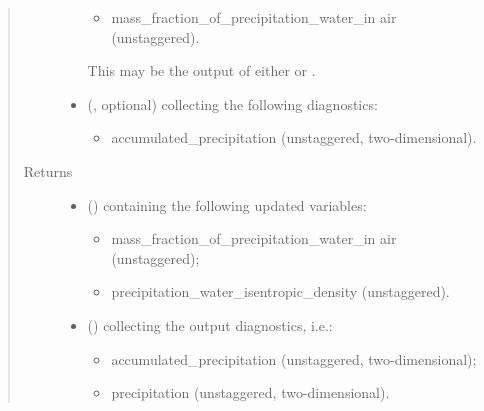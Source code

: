 \documentclass[letterpaper,10pt,english]{sphinxmanual}
\begin{document}
\begin{fulllineitems}
\begin{fulllineitems}
\begin{quote}
\begin{description}
\begin{itemize}
\begin{itemize}
\item {} 
mass\_fraction\_of\_precipitation\_water\_in air (unstaggered).

\end{itemize}

This may be the output of either
 or
.


\item {} 
 (, optional) \textendash{} 
 collecting the following diagnostics:
\begin{itemize}
\item {} 
accumulated\_precipitation (unstaggered, two-dimensional).

\end{itemize}


\end{itemize}

\item[{Returns}] \leavevmode
\begin{itemize}
\item {} 
 () \textendash{}  containing the following updated variables:
\begin{itemize}
\item {} 
mass\_fraction\_of\_precipitation\_water\_in air (unstaggered);

\item {} 
precipitation\_water\_isentropic\_density (unstaggered).

\end{itemize}

\item {} 
 () \textendash{}  collecting the output diagnostics, i.e.:
\begin{itemize}
\item {} 
accumulated\_precipitation (unstaggered, two-dimensional);

\item {} 
precipitation (unstaggered, two-dimensional).

\end{itemize}

\end{itemize}


\end{description}\end{quote}


\end{fulllineitems}
\end{fulllineitems}
\end{document}
